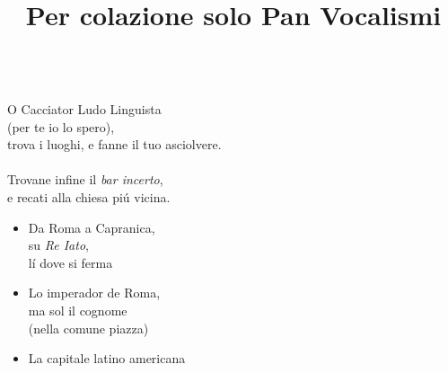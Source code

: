 \documentclass[12pt]{article}
\title{Per colazione solo Pan Vocalismi}
\date{}
\begin{document}
\maketitle

\ \\
O Cacciator Ludo Linguista \\
(per te io lo spero),\\
trova i luoghi, e fanne il tuo asciolvere.\\
\ \\
Trovane infine il \textit{bar incerto},\\
e recati alla chiesa piú vicina.

\begin{itemize}
\item Da Roma a Capranica, \\su \textit{Re Iato}, \\
  lí dove si ferma

\item Lo imperador de Roma, \\ma sol il cognome\\
  (nella comune piazza)

\item La capitale latino americana

\end{itemize}
\end{document}
